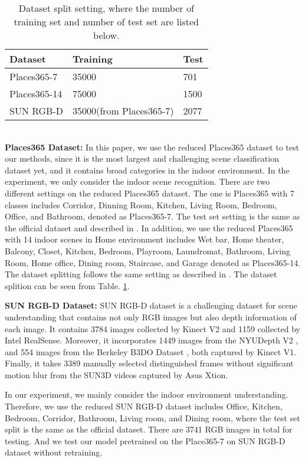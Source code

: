 \begin{table}[]
\centering
	\caption{Dataset split setting, where the number of training set and number of test set are listed below.}
	\label{tab:dataset_split}
	\begin{tabular}{l|l|l}
		\hline
		Dataset      & Training & Test  \\ \hline
		Places365-7  &  35000   & 701     \\ 
		Places365-14 &  75000   & 1500    \\ 
		SUN RGB-D    &  35000(from Places365-7)        & 2077    \\ \hline
	\end{tabular}
\end{table}
\ \\
\textbf{Places365 Dataset:}
In this paper, we use the reduced Places365 \cite{zhou2017places}  dataset to test our methods, since it is the most largest and challenging scene classification dataset yet, and it contains broad categories in the indoor environment. In the experiment, we only consider the indoor scene recognition. There are two different settings on the reduced Places365 dataset. The one is Places365 with 7 classes includes Corridor, Dinning Room, Kitchen, Living Room, Bedroom, Office, and Bathroom, denoted as Places365-7.  The test set setting is the same as the official dataset and described in \cite{pal2019deduce}.
In addition, we use the reduced Places365 with 14 indoor scenes in Home environment includes Wet bar, Home theater, Balcony, Closet, Kitchen, Bedroom, Playroom, Laundromat, Bathroom, Living Room, Home office, Dining room, Staircase, and Garage denoted as Places365-14. The dataset splitting follows the same setting as described in \cite{chen2019scene}. The dataset splition can be seen from Table. \ref{tab:dataset_split}.

\textbf{SUN RGB-D Dataset:}
SUN RGB-D dataset \cite{song2015sun} is a challenging dataset for scene understanding that contains not only RGB images but also depth information of each image. It contains 3784 images collected by Kinect V2 and 1159 collected by Intel RealSense. Moreover, it incorporates 1449 images from the NYUDepth V2 \cite{silberman2012indoor}, and 554 images from the Berkeley B3DO Dataset \cite{janoch2013category}, both captured by Kinect V1. Finally, it takes 3389 manually selected distinguished frames without significant motion blur from the SUN3D videos \cite{xiao2013sun3d} captured by Asus Xtion.

In our experiment, we mainly consider the indoor environment understanding. Therefore, we use the reduced SUN RGB-D dataset includes Office, Kitchen, Bedroom, Corridor, Bathroom, Living room, and Dining room, where the test set split is the same as the official dataset. There are 3741 RGB images in total for testing. And we test our model pretrained on the Place365-7 on SUN RGB-D dataset without retraining.



